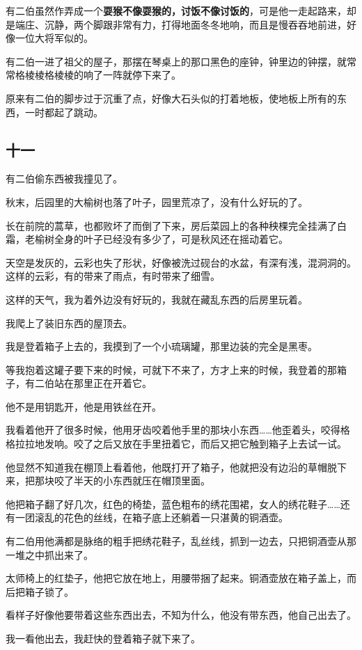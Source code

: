 \documentclass[UTF8]{ctexart}
\begin{document}
有二伯虽然作弄成一个\textbf{耍猴不像耍猴的，讨饭不像讨饭的}，可是他一走起路来，却是端庄、沉静，两个脚跟非常有力，打得地面冬冬地响，而且是慢吞吞地前进，好像一位大将军似的。

有二伯一进了祖父的屋子，那摆在琴桌上的那口黑色的座钟，钟里边的钟摆，就常常格棱棱格棱棱的响了一阵就停下来了。

原来有二伯的脚步过于沉重了点，好像大石头似的打着地板，使地板上所有的东西，一时都起了跳动。

\subsection{十一}

有二伯偷东西被我撞见了。

秋末，后园里的大榆树也落了叶子，园里荒凉了，没有什么好玩的了。

长在前院的蒿草，也都败坏了而倒了下来，房后菜园上的各种秧棵完全挂满了白霜，老榆树全身的叶子已经没有多少了，可是秋风还在摇动着它。

天空是发灰的，云彩也失了形状，好像被洗过砚台的水盆，有深有浅，混洞洞的。这样的云彩，有的带来了雨点，有时带来了细雪。

这样的天气，我为着外边没有好玩的，我就在藏乱东西的后房里玩着。

我爬上了装旧东西的屋顶去。

我是登着箱子上去的，我摸到了一个小琉璃罐，那里边装的完全是黑枣。

等我抱着这罐子要下来的时候，可就下不来了，方才上来的时候，我登着的那箱子，有二伯站在那里正在开着它。

他不是用钥匙开，他是用铁丝在开。

我看着他开了很多时候，他用牙齿咬着他手里的那块小东西……他歪着头，咬得格格拉拉地发响。咬了之后又放在手里扭着它，而后又把它触到箱子上去试一试。

他显然不知道我在棚顶上看着他，他既打开了箱子，他就把没有边沿的草帽脱下来，把那块咬了半天的小东西就压在帽顶里面。

他把箱子翻了好几次，红色的椅垫，蓝色粗布的绣花围裙，女人的绣花鞋子……还有一团滚乱的花色的丝线，在箱子底上还躺着一只湛黄的铜酒壶。

有二伯用他满都是脉络的粗手把绣花鞋子，乱丝线，抓到一边去，只把铜酒壶从那一堆之中抓出来了。

太师椅上的红垫子，他把它放在地上，用腰带捆了起来。铜酒壶放在箱子盖上，而后把箱子锁了。

看样子好像他要带着这些东西出去，不知为什么，他没有带东西，他自己出去了。

我一看他出去，我赶快的登着箱子就下来了。
\end{document}
